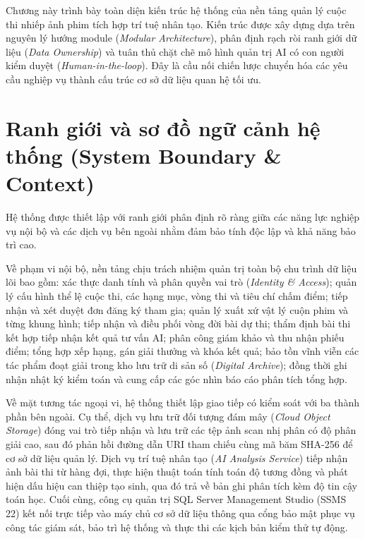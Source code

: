 
Chương này trình bày toàn diện kiến trúc hệ thống của nền tảng quản lý cuộc thi nhiếp ảnh phim tích hợp trí tuệ nhân tạo. Kiến trúc được xây dựng dựa trên nguyên lý hướng module (\textit{Modular Architecture}), phân định rạch ròi ranh giới dữ liệu (\textit{Data Ownership}) và tuân thủ chặt chẽ mô hình quản trị AI có con người kiểm duyệt (\textit{Human-in-the-loop}). Đây là cầu nối chiến lược chuyển hóa các yêu cầu nghiệp vụ thành cấu trúc cơ sở dữ liệu quan hệ tối ưu.

\section{Ranh giới và sơ đồ ngữ cảnh hệ thống (System Boundary \& Context)}
\label{s:c3_context}

Hệ thống được thiết lập với ranh giới phân định rõ ràng giữa các năng lực nghiệp vụ nội bộ và các dịch vụ bên ngoài nhằm đảm bảo tính độc lập và khả năng bảo trì cao.

Về phạm vi nội bộ, nền tảng chịu trách nhiệm quản trị toàn bộ chu trình dữ liệu lõi bao gồm: xác thực danh tính và phân quyền vai trò (\textit{Identity \& Access}); quản lý cấu hình thể lệ cuộc thi, các hạng mục, vòng thi và tiêu chí chấm điểm; tiếp nhận và xét duyệt đơn đăng ký tham gia; quản lý xuất xứ vật lý cuộn phim và từng khung hình; tiếp nhận và điều phối vòng đời bài dự thi; thẩm định bài thi kết hợp tiếp nhận kết quả tư vấn AI; phân công giám khảo và thu nhận phiếu điểm; tổng hợp xếp hạng, gán giải thưởng và khóa kết quả; bảo tồn vĩnh viễn các tác phẩm đoạt giải trong kho lưu trữ di sản số (\textit{Digital Archive}); đồng thời ghi nhận nhật ký kiểm toán và cung cấp các góc nhìn báo cáo phân tích tổng hợp.

Về mặt tương tác ngoại vi, hệ thống thiết lập giao tiếp có kiểm soát với ba thành phần bên ngoài. Cụ thể, dịch vụ lưu trữ đối tượng đám mây (\textit{Cloud Object Storage}) đóng vai trò tiếp nhận và lưu trữ các tệp ảnh scan nhị phân có độ phân giải cao, sau đó phản hồi đường dẫn URI tham chiếu cùng mã băm SHA-256 để cơ sở dữ liệu quản lý. Dịch vụ trí tuệ nhân tạo (\textit{AI Analysis Service}) tiếp nhận ảnh bài thi từ hàng đợi, thực hiện thuật toán tính toán độ tương đồng và phát hiện dấu hiệu can thiệp tạo sinh, qua đó trả về bản ghi phân tích kèm độ tin cậy toán học. Cuối cùng, công cụ quản trị SQL Server Management Studio (SSMS 22) kết nối trực tiếp vào máy chủ cơ sở dữ liệu thông qua cổng bảo mật phục vụ công tác giám sát, bảo trì hệ thống và thực thi các kịch bản kiểm thử tự động.

